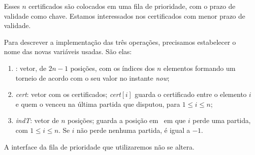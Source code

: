 Esses $n$ certificados são colocados em uma fila de prioridade,
com o prazo de validade como chave. Estamos interessados nos
certificados com menor prazo de validade.

Para descrever a implementação das três operações,
precisamos estabelecer o nome das novas variáveis usadas.
São elas:
\begin{enumerate}
    \item \torneio: vetor, de $2n - 1$ posições, com os
    índices dos $n$ elementos formando um torneio de acordo
    com o seu valor no instante \textit{now};

    \item \textit{cert}: vetor com os certificados;
    \textit{cert}$[i]$ guarda o certificado entre o elemento
    $i$ e quem o venceu na última partida que disputou, para
    $1 \leq i \leq n$;

    \item \textit{indT}: vetor de $n$ posições; \indt[$i$]
    guarda a posição em \torneio~em que $i$ perde uma partida,
    com $1 \leq i \leq n$. Se $i$ não perde nenhuma partida,
    \indt[$i$] é igual a $-1$.
\end{enumerate}

A interface da fila de prioridade que utilizaremos não se altera.



